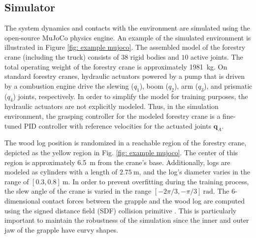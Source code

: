 \subsection{Simulator}
\label{sec: b simulator}

The system dynamics and contacts with the environment are simulated using the open-source MuJoCo \cite{todorov2012mujoco} physics engine. 
An example of the simulated environment is illustrated in Figure \ref{fig: example mujoco}. 
The assembled model of the forestry crane (including the truck) consists of $38$ rigid bodies and $10$ active joints. The total operating weight of the forestry crane is approximately \SI{1981}{\kilo\gram}. 
On standard forestry cranes, hydraulic actuators powered by a pump that is driven by a combustion engine drive the slewing ($q_1$), boom ($q_2$), arm ($q_3$), and prismatic ($q_4$) joints, respectively. 
In order to simplify the model for training purposes, the hydraulic actuators are not explicitly modeled. 
Thus, in the simulation environment, the grasping controller for the modeled forestry crane is a fine-tuned PID controller with reference velocities for the actuated joints $\mathbf{q}_A$.  

The wood log position is randomized in a reachable region of the forestry crane, depicted as the yellow region in Fig. \ref{fig: example mujoco}. 
The center of this region is approximately \SI{6.5}{\meter} from the crane's base. 
Additionally, logs are modeled as cylinders with a length of $\SI{2.75}{\meter}$, and the log's diameter varies in the range of $[0.3,0.8] \SI{}{\meter}$. 
In order to prevent overfitting during the training process, the slew angle of the crane is varied in the range $[-2\pi/3, -\pi/3] \SI{}{\radian}$. 
The 6-dimensional contact forces between the grapple and the wood log are computed using the signed distance field (SDF) collision primitive \cite{reiner2011interactive}. 
This is particularly important to maintain the robustness of the simulation since the inner and outer jaw of the grapple have curvy shapes. 









